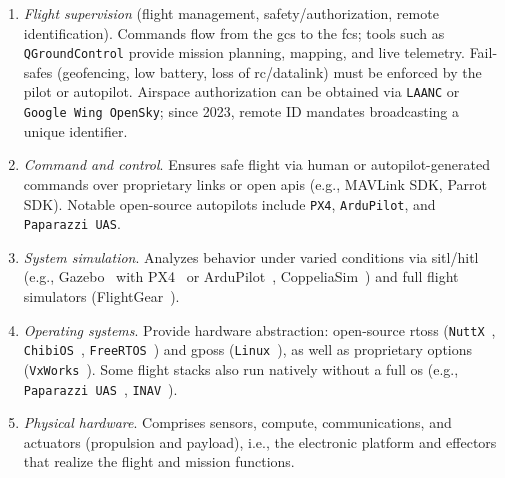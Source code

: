 \begin{enumerate}[label=(\arabic*)]
  \item \emph{Flight supervision} (flight management, safety/authorization, remote identification). 
        Commands flow from the \gls{gcs} to the \gls{fcs}; tools such as \lstinline|QGroundControl| provide mission planning, mapping, and live telemetry. 
        Fail-safes (geofencing, low battery, loss of \gls{rc}/datalink) must be enforced by the pilot or autopilot. 
        Airspace authorization can be obtained via \lstinline|LAANC| or \lstinline|Google Wing OpenSky|; since 2023, remote ID mandates broadcasting a unique identifier.

  \item \emph{Command and control}. 
        Ensures safe flight via human or autopilot-generated commands over proprietary links or open \glspl{api} (e.g., MAVLink SDK, Parrot SDK). 
        Notable open-source autopilots include \lstinline|PX4|, \lstinline|ArduPilot|, and \lstinline|Paparazzi UAS|.

  \item \emph{System simulation}. 
        Analyzes behavior under varied conditions via \gls{sitl}/\gls{hitl} (e.g., Gazebo~\cite{garcia_simulation_2022} with PX4~\cite{px4-sim} or ArduPilot~\cite{arduPilot-sim}, CoppeliaSim~\cite{coppelia-sim}) and full flight simulators (FlightGear~\cite{flightgear}).

  \item \emph{Operating systems}. 
        Provide hardware abstraction: open-source \glspl{rtos} (\lstinline|NuttX|~\cite{px4-home}, \lstinline|ChibiOS|~\cite{arduPilot-home}, \lstinline|FreeRTOS|~\cite{librePilot-arch}) and \glspl{gpos} (\lstinline|Linux|~\cite{px4-pilotpi}), as well as proprietary options (\lstinline|VxWorks|~\cite{vxWorks-uav-aribus-helionic}). 
        Some flight stacks also run natively without a full \gls{os} (e.g., \lstinline|Paparazzi UAS|~\cite{paparazzi-github}, \lstinline|INAV|~\cite{inav-github}).

  \item \emph{Physical hardware}. 
        Comprises sensors, compute, communications, and actuators (propulsion and payload), i.e., the electronic platform and effectors that realize the flight and mission functions.
\end{enumerate}


